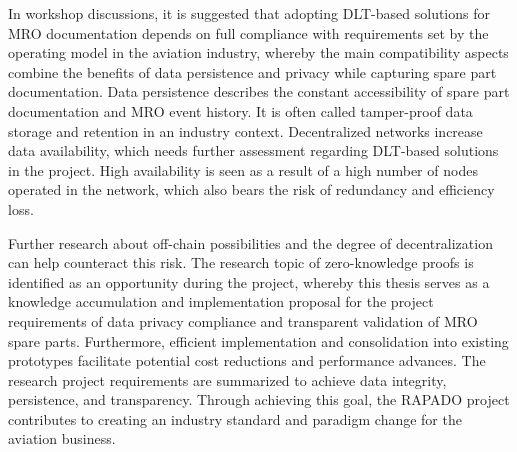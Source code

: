 \begin{comment}
- hier die Opremic slides einarbeiten
- die use cases definieren (Bastis part)
\end{comment}
In workshop discussions, it is suggested that adopting DLT-based solutions for MRO documentation depends on full compliance with requirements set by the operating model in the aviation industry, whereby the main compatibility aspects combine the benefits of data persistence and privacy while capturing spare part documentation. Data persistence describes the constant accessibility of spare part documentation and MRO event history. It is often called tamper-proof data storage and retention in an industry context. Decentralized networks increase data availability, which needs further assessment regarding DLT-based solutions in the project. High availability is seen as a result of a high number of nodes operated in the network, which also bears the risk of redundancy and efficiency loss.

Further research about off-chain possibilities and the degree of decentralization can help counteract this risk. The research topic of zero-knowledge proofs is identified as an opportunity during the project, whereby this thesis serves as a knowledge accumulation and implementation proposal for the project requirements of data privacy compliance and transparent validation of MRO spare parts. Furthermore, efficient implementation and consolidation into existing prototypes facilitate potential cost reductions and performance advances. The research project requirements are summarized to achieve data integrity, persistence, and transparency. Through achieving this goal, the RAPADO project contributes to creating an industry standard and paradigm change for the aviation business.



\begin{comment}
-go thru zedel kliewer and list principles, say that zkps were one solution criteria mentioned already
-look further to semester project intros: 
(i) High speed of the system to not intervene with processes of part usage.
(ii) Consolidation of parts and certificates from different sources.
(iii) Persistence of data while operating in a trust-free and permission-based environment to secure anti-counterfeiting and confidentiality.

next:
-security and privacy
-transparency
- concepts for privacy identified: ZKP as one outcome of previous research for future research
- for this, three main requirements resulted: 1)knowledge accumulation 2)privacy vs transparency 3)digitization and data formats fit for purpose
--> use backings from project literature used also in semester project and jans publication
\end{comment}

